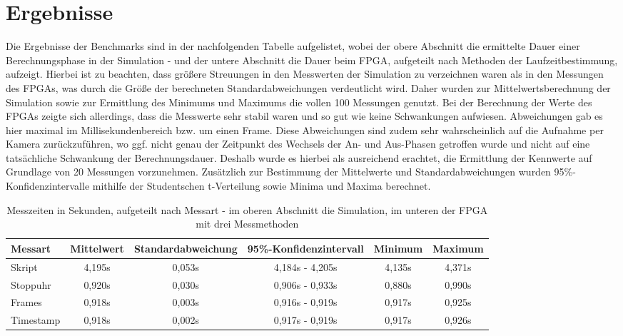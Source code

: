 \section{Ergebnisse}
    Die Ergebnisse der Benchmarks sind in der nachfolgenden Tabelle aufgelistet, wobei der obere Abschnitt die ermittelte Dauer einer Berechnungsphase in der Simulation - und der untere Abschnitt die Dauer beim FPGA, aufgeteilt nach Methoden der Laufzeitbestimmung, aufzeigt.
    Hierbei ist zu beachten, dass größere Streuungen in den Messwerten der Simulation zu verzeichnen waren als in den Messungen des FPGAs, was durch die Größe der berechneten Standardabweichungen verdeutlicht wird.
    Daher wurden zur Mittelwertsberechnung der Simulation sowie zur Ermittlung des Minimums und Maximums die vollen 100 Messungen genutzt.
    Bei der Berechnung der Werte des FPGAs zeigte sich allerdings, dass die Messwerte sehr stabil waren und so gut wie keine Schwankungen aufwiesen.
    Abweichungen gab es hier maximal im Millisekundenbereich bzw. um einen Frame.
    Diese Abweichungen sind zudem sehr wahrscheinlich auf die Aufnahme per Kamera zurückzuführen, wo ggf. nicht genau der Zeitpunkt des Wechsels der An- und Aus-Phasen getroffen wurde und nicht auf eine tatsächliche Schwankung der Berechnungsdauer.
    Deshalb wurde es hierbei als ausreichend erachtet, die Ermittlung der Kennwerte auf Grundlage von 20 Messungen vorzunehmen.
    Zusätzlich zur Bestimmung der Mittelwerte und Standardabweichungen wurden 95\%-Konfidenzintervalle mithilfe der Studentschen t-Verteilung sowie Minima und Maxima berechnet.
    \begin{table}
        \centering
        \begin{tabular}{lccccc}
            \toprule
            Messart     & Mittelwert  & Standardabweichung  & 95\%-Konfidenzintervall & Minimum & Maximum\\
            \midrule
            Skript      &   4,195s    &       0,053s        &     4,184s - 4,205s     &  4,135s  &  4,371s\\
            \midrule
            Stoppuhr    &   0,920s    &       0,030s        &     0,906s - 0,933s     &  0,880s  &  0,990s\\
            Frames      &   0,918s    &       0,003s        &     0,916s - 0,919s     &  0,917s  &  0,925s\\
            Timestamp   &   0,918s    &       0,002s        &     0,917s - 0,919s     &  0,917s  &  0,926s\\
            \bottomrule
        \end{tabular}
        \caption[Benchmarks]{Messzeiten in Sekunden, aufgeteilt nach Messart - im oberen Abschnitt die Simulation, im unteren der FPGA mit drei Messmethoden}
        \label{tab:module}
    \end{table}

